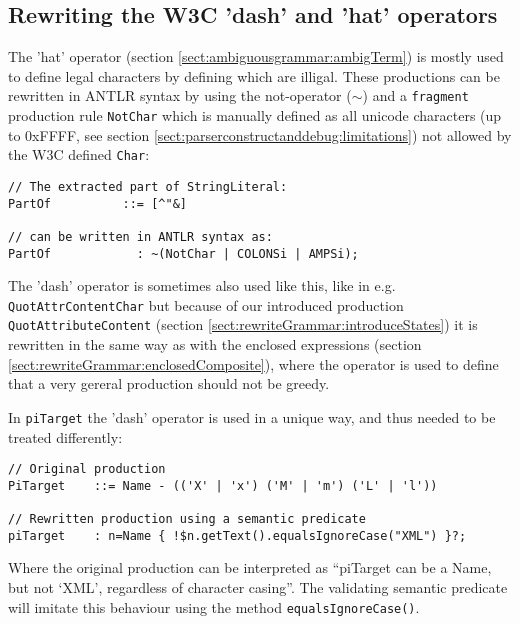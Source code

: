 \subsection{Rewriting the W3C 'dash' and 'hat' operators}
The 'hat' operator (section \ref{sect:ambiguousgrammar:ambigTerm}) is mostly used to define legal characters by defining which are illigal. These productions can be rewritten in ANTLR syntax by using the not-operator ($\sim$) and a \verb!fragment! production rule \verb!NotChar! which is manually defined as all unicode characters (up to 0xFFFF, see section \ref{sect:parserconstructanddebug:limitations}) not allowed by the W3C defined \verb!Char!:
\begin{verbatim}
// The extracted part of StringLiteral:
PartOf          ::= [^"&]

// can be written in ANTLR syntax as:
PartOf            : ~(NotChar | COLONSi | AMPSi);
\end{verbatim}
The 'dash' operator is sometimes also used like this, like in e.g. \verb!QuotAttrContentChar! but because of our introduced production \verb!QuotAttributeContent! (section \ref{sect:rewriteGrammar:introduceStates}) it is rewritten in the same way as with the enclosed expressions (section \ref{sect:rewriteGrammar:enclosedComposite}), where the operator is used to define that a very gereral production should not be greedy. 

In \verb!piTarget! the 'dash' operator is used in a unique way, and thus needed to be treated differently:
\begin{verbatim}
// Original production
PiTarget    ::= Name - (('X' | 'x') ('M' | 'm') ('L' | 'l'))

// Rewritten production using a semantic predicate
piTarget    : n=Name { !$n.getText().equalsIgnoreCase("XML") }?;
\end{verbatim}
Where the original production can be interpreted as ``piTarget can be a Name, but not `XML', regardless of character casing''. The validating semantic predicate will imitate this behaviour using the method \verb!equalsIgnoreCase()!.

